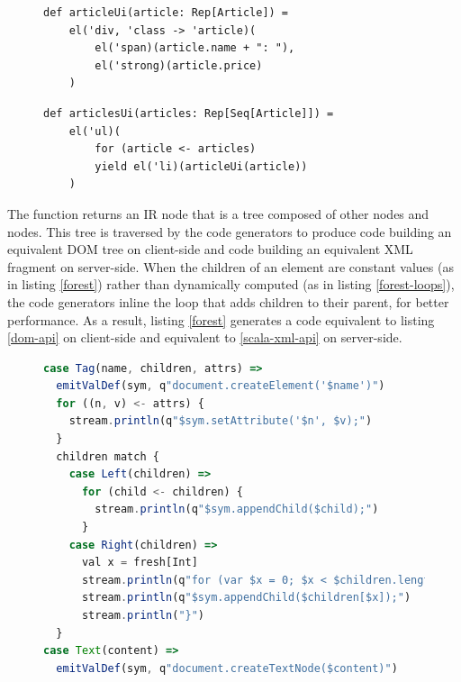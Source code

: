 \documentclass[preprint]{sigplanconf}
\begin{document}
\begin{figure}
\begin{lstlisting}[label=forest,caption=DOM definition DSL]
def articleUi(article: Rep[Article]) =
    el('div, 'class -> 'article)(
        el('span)(article.name + ": "),
        el('strong)(article.price)
    )
\end{lstlisting}
\end{figure}

\begin{figure}
\begin{lstlisting}[label=forest-loops,caption=Using loops]
def articlesUi(articles: Rep[Seq[Article]]) =
    el('ul)(
        for (article <- articles)
        yield el('li)(articleUi(article))
    )
\end{lstlisting}
\end{figure}

The  function returns an  IR node that is a tree composed of other
 nodes and  nodes. This tree is traversed by the code generators to produce
code building an equivalent DOM tree on client-side and code building an equivalent XML fragment on
server-side. When the children of an element are constant values (as in listing \ref{forest}) rather
than dynamically computed (as in listing \ref{forest-loops}), the code generators inline the loop
that adds children to their parent, for better performance. As a result, listing \ref{forest}
generates a code equivalent to listing \ref{dom-api} on client-side and equivalent to
\ref{scala-xml-api} on server-side.

\begin{figure}
\begin{lstlisting}[language=JavaScript,label=js-gen-forest,caption=JavaScript code generator for the
DOM fragment definition DSL,basicstyle=\ssmall]
case Tag(name, children, attrs) =>
  emitValDef(sym, q"document.createElement('$name')")
  for ((n, v) <- attrs) {
    stream.println(q"$sym.setAttribute('$n', $v);")
  }
  children match {
    case Left(children) =>
      for (child <- children) {
        stream.println(q"$sym.appendChild($child);")
      }
    case Right(children) =>
      val x = fresh[Int]
      stream.println(q"for (var $x = 0; $x < $children.length; $x++) {")
      stream.println(q"$sym.appendChild($children[$x]);")
      stream.println("}")
  }
case Text(content) =>
  emitValDef(sym, q"document.createTextNode($content)")
\end{lstlisting}
\end{figure}
\end{document}
